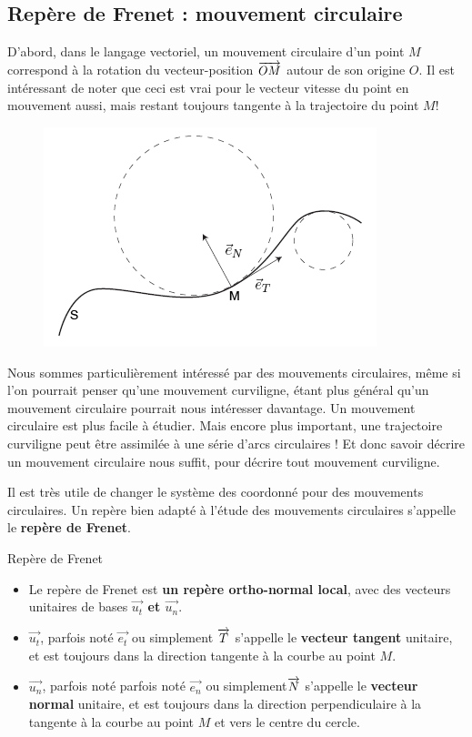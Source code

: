 \documentclass[11pt,a4paper]{article}
\begin{document}
\subsection{Repère de Frenet : mouvement circulaire}

D'abord, dans le langage vectoriel, un mouvement circulaire d'un point $M$ correspond à la rotation du vecteur-position $ \overrightarrow{OM}$ autour de son origine $O$. Il est intéressant de noter que ceci est vrai pour le vecteur vitesse du point en mouvement aussi, mais restant toujours tangente à la trajectoire du point $M$! 

\begin{figure}
    \centering
    \includegraphics[width=.95\linewidth]{imgs/p1/tangent.png}
\end{figure}

Nous sommes particulièrement intéressé par des mouvements circulaires, même si l'on pourrait penser qu'une mouvement curviligne, étant plus général qu'un mouvement circulaire pourrait nous intéresser davantage. Un mouvement circulaire est plus facile à étudier. Mais encore plus important, une trajectoire curviligne peut être assimilée à une série d'arcs circulaires ! Et donc savoir décrire un mouvement circulaire nous suffit, pour décrire tout mouvement curviligne. 

Il est très utile de changer le système des coordonné pour des mouvements circulaires. Un repère bien adapté à l'étude des mouvements circulaires s'appelle le \textbf{repère de Frenet}. 

\begin{defn}{Repère de Frenet}
\begin{itemize}
    \item Le repère de Frenet est \textbf{un repère ortho-normal local}, avec des vecteurs unitaires de bases \textbf{$\vec{u_t}$ et $\vec{u_n}$}. 
    \item $\vec{u_t}$, parfois noté $\vec{e_t}$ ou simplement $\overrightarrow{T}$ s'appelle le \textbf{vecteur tangent} unitaire, et est toujours dans la direction tangente à la courbe au point $M$.
    \item $\vec{u_n}$, parfois noté parfois noté $\vec{e_n}$ ou simplement$\overrightarrow{N}$ s'appelle le \textbf{vecteur normal} unitaire, et est toujours dans la direction perpendiculaire à la tangente à la courbe au point $M$ et vers le centre du cercle. 
\end{itemize}
\end{defn}
\end{document}
